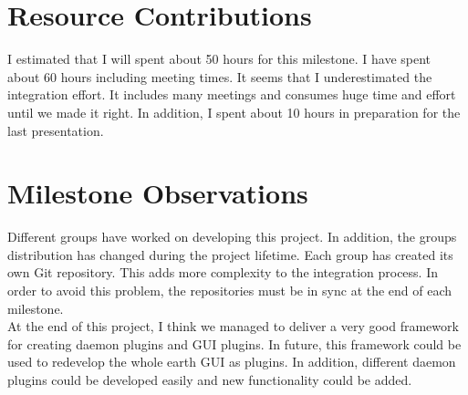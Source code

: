 \newpage

\section*{Resource Contributions}
I estimated that I will spent about 50 hours for this milestone. I have spent about 60 hours including meeting times. It seems that I underestimated the integration effort. It includes many meetings and consumes huge time and effort until we made it right. In addition, I spent about 10 hours in preparation for the last presentation.


\section*{Milestone Observations}
Different groups have worked on developing this project. In addition, the groups distribution has changed during the project lifetime. Each group has created its own Git repository. This adds more complexity to the integration process. In order to avoid this problem, the repositories must be in sync at the end of each milestone. \\
At the end of this project, I think we managed to deliver a very good framework for creating daemon plugins and GUI plugins. In future, this framework could be used to redevelop the whole earth GUI as plugins. In addition, different daemon plugins could be developed easily and new functionality could be added. 

